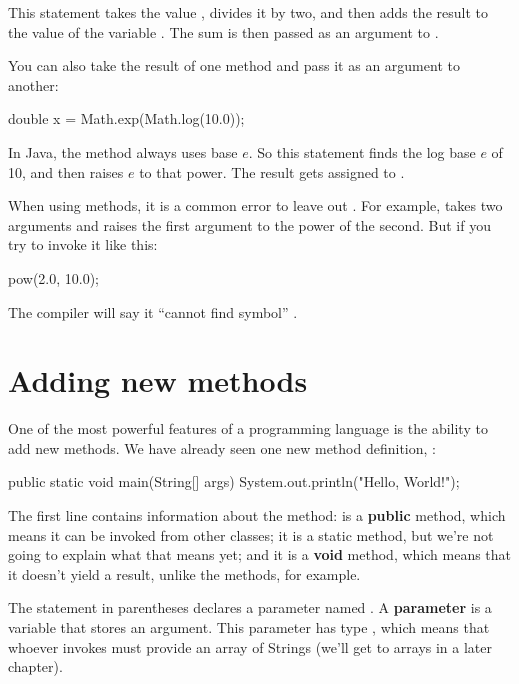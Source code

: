 This statement takes the value , divides it by two, and then adds the result to the value of the variable .
The sum is then passed as an argument to .

You can also take the result of one method and pass it as an argument to another:

\begin{code}
    double x = Math.exp(Math.log(10.0));
\end{code}

In Java, the  method always uses base $e$.
So this statement finds the log base $e$ of 10, and then raises $e$ to that power.
The result gets assigned to .

When using  methods, it is a common error to leave out .
For example,  takes two arguments and raises the first argument to the power of the second.
But if you try to invoke it like this:

\begin{code}
    pow(2.0, 10.0);
\end{code}

The compiler will say it ``cannot find symbol'' .


\section{Adding new methods}
\label{adding_methods}


One of the most powerful features of a programming language is the ability to add new methods.
We have already seen one new method definition, :

\begin{code}
    public static void main(String[] args) {
        System.out.println("Hello, World!");
    }
\end{code}

The first line contains information about the method:
 is a {\bf public} method, which means it can be invoked from other classes;
it is a static method, but we're not going to explain what that means yet;
and it is a {\bf void} method, which means that it doesn't yield a result, unlike the  methods, for example.

The statement in parentheses declares a parameter named
.  A {\bf parameter} is a variable that stores an argument.
This parameter has type , which means that whoever invokes  must provide an array of Strings (we'll get to arrays in a later chapter).

